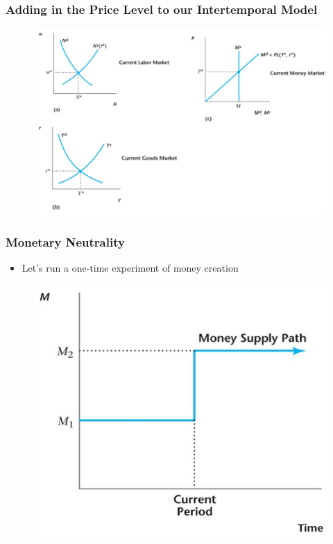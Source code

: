 \documentclass{beamer}
\begin{document}
\begin{frame}
\frametitle[alignment=center]{Adding in the Price Level to our Intertemporal Model}
\begin{figure}
\centering
\includegraphics[scale=0.65]{Figures/W_Fig_12pt9.png}
\end{figure}
\end{frame}

\begin{frame}
\frametitle[alignment=center]{Monetary Neutrality}
\begin{itemize}
\item Let's run a one-time experiment of money creation
\end{itemize}
\begin{figure}
\centering
\includegraphics[scale=0.65]{Figures/W_Fig_12pt10.png}
\end{figure}
\end{frame}
\end{document}
